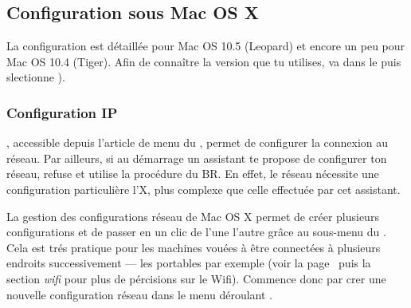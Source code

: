 

\subsection{Configuration sous Mac OS X}

La configuration est détaillée pour Mac OS 10.5 (Leopard) et encore un peu pour Mac OS 10.4 (Tiger). Afin de connaître la version que tu utilises, va dans le  puis slectionne ).

\subsubsection{Configuration IP}

 , accessible depuis l'article de menu  du , permet de configurer la connexion au réseau. Par ailleurs, si au démarrage un assistant te propose de configurer ton réseau, refuse et utilise la procédure du BR. En effet, le réseau nécessite une configuration particulière  l'X, plus complexe que celle effectuée par cet assistant.



La gestion des configurations réseau de Mac OS X permet de créer plusieurs configurations et de passer en un clic de l'une  l'autre grâce au sous-menu  du . Cela est trés pratique pour les machines vouées à être connectées à plusieurs endroits successivement --- les portables par exemple (voir la page~\pageref{wifi} puis la section \emph{wifi} pour plus de pércisions sur le Wifi). Commence donc par crer une nouvelle configuration réseau dans le menu déroulant .


